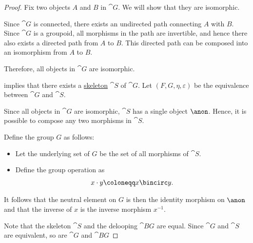 \begin{proof}
   Fix two objects \( A \) and \( B \) in \( \cat{G} \). We will show that they are isomorphic.

  Since \( \cat{G} \) is connected, there exists an undirected path connecting \( A \) with \( B \). Since \( \cat{G} \) is a groupoid, all morphisms in the path are invertible, and hence there also exists a directed path from \( A \) to \( B \). This directed path can be composed into an isomorphism from \( A \) to \( B \).

  Therefore, all objects in \( \cat{G} \) are isomorphic.

    implies that there exists a \hyperref[def:skeletal_category]{skeleton} \( \cat{S} \) of \( \cat{G} \). Let \( (F, G, \eta, \varepsilon) \) be the equivalence between \( \cat{G} \) and \( \cat{S} \).

  Since all objects in \( \cat{G} \) are isomorphic, \( \cat{S} \) has a single object \( \anon \). Hence, it is possible to compose any two morphisms in \( \cat{S} \).

  Define the group \( G \) as follows:
  \begin{itemize}
    \item Let the underlying set of \( G \) be the set of all morphisms of \( \cat{S} \).
    \item Define the group operation as
    \begin{equation*}
      x \cdot y \coloneqq x \bincirc y.
    \end{equation*}
  \end{itemize}

  It follows that the neutral element on \( G \) is then the identity morphism on \( \anon \) and that the inverse of \( x \) is the inverse morphism \( x^{-1} \).

   Note that the skeleton \( \cat{S} \) and the delooping \( \cat{B} G \) are equal. Since \( \cat{G} \) and \( \cat{S} \) are equivalent, so are \( \cat{G} \) and \( \cat{B} G \)
\end{proof}

